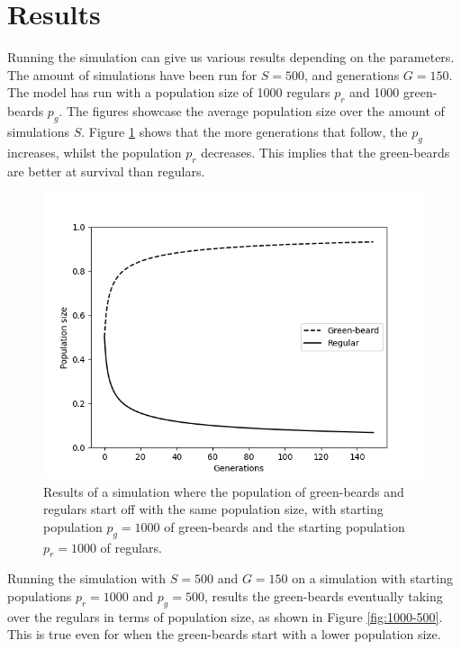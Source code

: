 \documentclass[conference]{IEEEtran}
\begin{document}
	\section{Results}
	Running the simulation can give us various results depending on the parameters. The amount of simulations have been run for $S = 500$, and generations $G = 150$. The model has run with a population size of 1000 regulars $p_r$ and 1000 green-beards $p_g$. The figures showcase the average population size over the amount of simulations $S$. Figure \ref{fig:50-50} shows that the more generations that follow, the $p_g$ increases, whilst the population $p_r$ decreases. This implies that the green-beards are better at survival than regulars. 

	\begin{figure}[htbp]
		\centerline{\includegraphics[scale=0.5]{figures/50-50.png}}
		\caption{Results of a simulation where the population of green-beards and regulars start off with the same population size, with starting population $p_g = 1000$ of green-beards and the starting population $p_r = 1000$ of regulars.}
		\label{fig:50-50}
	\end{figure}
	
	Running the simulation with $S = 500$ and $G = 150$ on a simulation with starting populations $p_r = 1000$ and $p_g = 500$, results the green-beards eventually taking over the regulars in terms of population size, as shown in Figure \ref{fig:1000-500}. This is true even for when the green-beards start with a lower population size.
\end{document}
